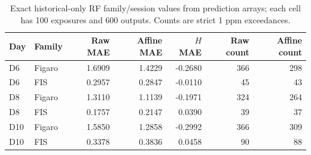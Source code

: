 \begin{table}[H]\centering\small
\caption{Exact historical-only RF family/session values from prediction arrays; each cell has 100 exposures and 600 outputs. Counts are strict 1 ppm exceedances.}\label{tab:family}
\setlength{\tabcolsep}{4pt}\begin{tabular}{llrrrrr}
\toprule
Day & Family & Raw MAE & Affine MAE & $H$ MAE & Raw count & Affine count \\ \midrule
D6 & Figaro & 1.6909 & 1.4229 & -0.2680 & 366 & 298 \\
D6 & FIS & 0.2957 & 0.2847 & -0.0110 & 45 & 43 \\
D8 & Figaro & 1.3110 & 1.1139 & -0.1971 & 324 & 264 \\
D8 & FIS & 0.1757 & 0.2147 & 0.0390 & 39 & 37 \\
D10 & Figaro & 1.5850 & 1.2858 & -0.2992 & 366 & 309 \\
D10 & FIS & 0.3378 & 0.3836 & 0.0458 & 90 & 88 \\
\bottomrule\end{tabular}\end{table}
